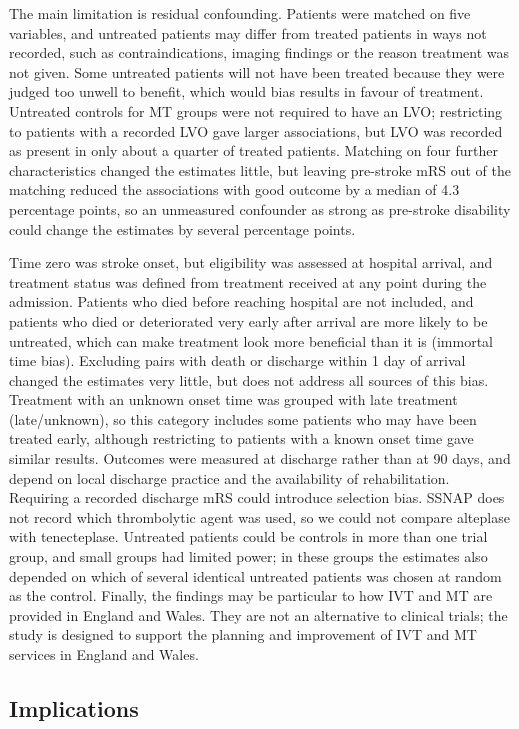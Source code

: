 The main limitation is residual confounding. Patients were matched on five variables, and untreated patients may differ from treated patients in ways not recorded, such as contraindications, imaging findings or the reason treatment was not given. Some untreated patients will not have been treated because they were judged too unwell to benefit, which would bias results in favour of treatment. Untreated controls for MT groups were not required to have an LVO; restricting to patients with a recorded LVO gave larger associations, but LVO was recorded as present in only about a quarter of treated patients. Matching on four further characteristics changed the estimates little, but leaving pre-stroke mRS out of the matching reduced the associations with good outcome by a median of 4.3 percentage points, so an unmeasured confounder as strong as pre-stroke disability could change the estimates by several percentage points.

Time zero was stroke onset, but eligibility was assessed at hospital arrival, and treatment status was defined from treatment received at any point during the admission. Patients who died before reaching hospital are not included, and patients who died or deteriorated very early after arrival are more likely to be untreated, which can make treatment look more beneficial than it is (immortal time bias). Excluding pairs with death or discharge within 1 day of arrival changed the estimates very little, but does not address all sources of this bias. Treatment with an unknown onset time was grouped with late treatment (late/unknown), so this category includes some patients who may have been treated early, although restricting to patients with a known onset time gave similar results. Outcomes were measured at discharge rather than at 90 days, and depend on local discharge practice and the availability of rehabilitation. Requiring a recorded discharge mRS could introduce selection bias. SSNAP does not record which thrombolytic agent was used, so we could not compare alteplase with tenecteplase. Untreated patients could be controls in more than one trial group, and small groups had limited power; in these groups the estimates also depended on which of several identical untreated patients was chosen at random as the control. Finally, the findings may be particular to how IVT and MT are provided in England and Wales. They are not an alternative to clinical trials; the study is designed to support the planning and improvement of IVT and MT services in England and Wales.

\subsection{Implications}

